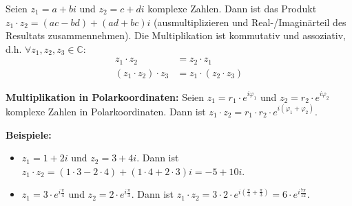 \documentclass[12pt]{article}
\newcommand{\C}{\mathbb{C}}
\newenvironment{definition}[2][Definition]{\begin{trivlist}
        \item[\hskip \labelsep {\bfseries #1}\hskip \labelsep {\bfseries #2.}]}{\flushright{$\square$}\end{trivlist}}
\begin{document}
\begin{definition}{[Multiplikation]}
        Seien $z_1=a+bi$ und $z_2=c+di$ komplexe Zahlen. Dann ist das Produkt $z_1\cdot z_2=(ac-bd)+(ad+bc)i$ (ausmultiplizieren und Real-/Imaginärteil des Resultats zusammennehmen). Die Multiplikation ist kommutativ und assoziativ, d.h. $\forall z_1,z_2,z_3\in\C$:
        \begin{align*}
                z_1\cdot z_2            & =z_2\cdot z_1            \\
                (z_1\cdot z_2)\cdot z_3 & =z_1\cdot (z_2\cdot z_3)
        \end{align*}

        \textbf{Multiplikation in Polarkoordinaten:} Seien $z_1=r_1\cdot e^{i\varphi_1}$ und $z_2=r_2\cdot e^{i\varphi_2}$ komplexe Zahlen in Polarkoordinaten. Dann ist $z_1\cdot z_2=r_1\cdot r_2\cdot e^{i(\varphi_1+\varphi_2)}$.

        \textbf{Beispiele:}
        \begin{itemize}
                \item[(1)] $z_1=1+2i$ und $z_2=3+4i$. Dann ist $z_1\cdot z_2=(1\cdot 3-2\cdot 4)+(1\cdot 4+2\cdot 3)i=-5+10i$.
                \item[(2)] $z_1=3\cdot e^{i\frac{\pi}{4}}$ und $z_2=2\cdot e^{i\frac{\pi}{3}}$. Dann ist $z_1\cdot z_2=3\cdot 2\cdot e^{i\left(\frac{\pi}{4}+\frac{\pi}{3}\right)}=6\cdot e^{i\frac{7\pi}{12}}$.
        \end{itemize}
\end{definition}
\end{document}
